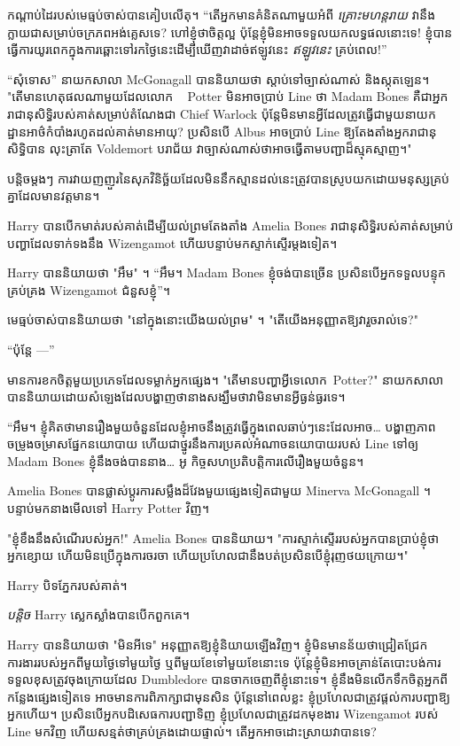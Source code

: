 កណ្តាប់ដៃរបស់មេធ្មប់ចាស់បានគៀបលើតុ។ “តើអ្នកមានគំនិតណាមួយអំពី \emph{គ្រោះមហន្តរាយ} វានឹងក្លាយជាសម្រាប់ចក្រភពអង់គ្លេសទេ? ហៅ​ខ្ញុំ​ថា​ចិត្ត​ល្អ ប៉ុន្តែ​ខ្ញុំ​មិន​អាច​ទទួល​យក​លទ្ធផល​នោះ​ទេ! ខ្ញុំ​បាន​ធ្វើ​ការ​យូរ​ពេក​ក្នុង​ការ​ឆ្ពោះ​ទៅ​រក​ថ្ងៃ​នេះ​ដើម្បី​ឃើញ​វា​ដាច់​ឥឡូវ​នេះ \emph{ឥឡូវ​នេះ} គ្រប់​ពេល!”

“សុំទោស” នាយកសាលា McGonagall បាននិយាយថា ស្តាប់ទៅច្បាស់ណាស់ និងស្កុតឡេន។ "តើមានហេតុផលណាមួយដែលលោក ~ Potter មិនអាចប្រាប់ Line ថា Madam Bones គឺជាអ្នករាជានុសិទ្ធិរបស់គាត់សម្រាប់តំណែងជា Chief Warlock ប៉ុន្តែមិនមានអ្វីដែលត្រូវធ្វើជាមួយនាយកដ្ឋានអាថ៌កំបាំងរហូតដល់គាត់មានអាយុ? ប្រសិនបើ Albus អាចប្រាប់ Line ឱ្យតែងតាំងអ្នករាជានុសិទ្ធិបាន លុះត្រាតែ Voldemort បរាជ័យ វាច្បាស់ណាស់ថាអាចធ្វើតាមបញ្ជាដ៏ស្មុគស្មាញ។"

បន្តិចម្ដងៗ ការវាយញញួរនៃសុភវិនិច្ឆ័យដែលមិននឹកស្មានដល់នេះត្រូវបានស្រូបយកដោយមនុស្សគ្រប់គ្នាដែលមានវត្តមាន។

Harry បានបើកមាត់របស់គាត់ដើម្បីយល់ព្រមតែងតាំង Amelia Bones រាជានុសិទ្ធិរបស់គាត់សម្រាប់បញ្ហាដែលទាក់ទងនឹង Wizengamot ហើយបន្ទាប់មកស្ទាក់ស្ទើរម្តងទៀត។

Harry បាននិយាយថា "អឹម" ។ “អឹម។ Madam Bones ខ្ញុំចង់បានច្រើន ប្រសិនបើអ្នកទទួលបន្ទុកគ្រប់គ្រង Wizengamot ជំនួសខ្ញុំ”។

មេធ្មប់ចាស់បាននិយាយថា "នៅក្នុងនោះយើងយល់ព្រម" ។ "តើយើងអនុញ្ញាតឱ្យវារួចរាល់ទេ?"

“ប៉ុន្តែ —”

មានការខកចិត្តមួយប្រភេទដែលទម្លាក់អ្នកផ្សេង។ "តើមានបញ្ហាអ្វីទេលោក~Potter?" នាយក​សាលា​បាន​និយាយ​ដោយ​សំឡេង​ដែល​បង្ហាញ​ថា​នាង​សង្ឃឹម​ថា​វា​មិន​មាន​អ្វី​ធ្ងន់ធ្ងរ​ទេ។

“អឹម។ ខ្ញុំ​គិត​ថា​មាន​រឿង​មួយ​ចំនួន​ដែល​ខ្ញុំ​អាច​នឹង​ត្រូវ​ធ្វើ​ក្នុង​ពេល​ឆាប់​ៗ​នេះ​ដែល​អាច… បង្ហាញ​ភាព​ចម្រូងចម្រាស​ផ្នែក​នយោបាយ ហើយ​ជា​ថ្នូរ​នឹង​ការ​ប្រគល់​អំណាច​នយោបាយ​របស់ Line ទៅ​ឲ្យ Madam Bones ខ្ញុំ​នឹង​ចង់​បាន​នាង… អូ កិច្ច​សហប្រតិបត្តិការ​លើ​រឿង​មួយ​ចំនួន។

Amelia Bones បានផ្លាស់ប្តូរការសម្លឹងដ៏វែងមួយផ្សេងទៀតជាមួយ Minerva McGonagall ។ បន្ទាប់មកនាងមើលទៅ Harry Potter វិញ។

"ខ្ញុំខឹងនឹងសំណើរបស់អ្នក!" Amelia Bones បាននិយាយ។ "ការស្ទាក់ស្ទើររបស់អ្នកបានប្រាប់ខ្ញុំថា អ្នកខ្សោយ ហើយមិនប្រើក្នុងការចរចា ហើយប្រហែលជានឹងបត់ប្រសិនបើខ្ញុំរុញថយក្រោយ។"

Harry បិទភ្នែករបស់គាត់។

\emph{បន្តិច} Harry ស្លេកស្លាំងបានបើកពួកគេ។

Harry បាននិយាយថា "មិនអីទេ" អនុញ្ញាតឱ្យខ្ញុំនិយាយឡើងវិញ។ ខ្ញុំមិនមានន័យថាជ្រៀតជ្រែកការងាររបស់អ្នកពីមួយថ្ងៃទៅមួយថ្ងៃ ឬពីមួយខែទៅមួយខែនោះទេ ប៉ុន្តែខ្ញុំមិនអាចគ្រាន់តែបោះបង់ការទទួលខុសត្រូវចុងក្រោយដែល Dumbledore បានចាកចេញពីខ្ញុំនោះទេ។ ខ្ញុំ​នឹង​មិន​លើក​ទឹក​ចិត្ត​អ្នក​ពី​កន្លែង​ផ្សេង​ទៀត​ទេ អាច​មាន​ការ​ពិភាក្សា​ជា​មុន​សិន ប៉ុន្តែ​នៅ​ពេល​ខ្លះ ខ្ញុំ​ប្រហែល​ជា​ត្រូវ​ផ្តល់​ការ​បញ្ជា​ឱ្យ​អ្នក​ហើយ។ ប្រសិនបើអ្នកបដិសេធការបញ្ជាទិញ ខ្ញុំប្រហែលជាត្រូវដកមុខងារ Wizengamot របស់ Line មកវិញ ហើយសន្មត់ថាគ្រប់គ្រងដោយផ្ទាល់។ តើអ្នកអាចដោះស្រាយវាបានទេ?

